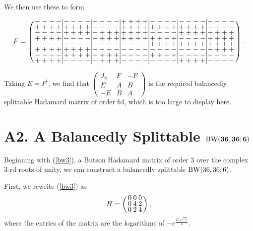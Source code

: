 \documentclass[../../main]{subfiles}
\begin{document}
We then use these to form
\begin{small}
\[
  F =
  \arraycolsep=1.25pt\def\arraystretch{0.625}
  \left(
    \begin{array}{cccc|cccc|cccc|cccc|cccc|cccc|cccc}
      -&-&-&-&-&-&-&-&-&-&-&-&+&+&+&+&-&-&-&-&-&-&-&-&-&-&-&-\\
      +&+&+&+&+&+&+&+&-&-&-&-&+&+&+&+&+&+&+&+&+&+&+&+&-&-&-&-\\
      -&-&-&-&+&+&+&+&+&+&+&+&+&+&+&+&-&-&-&-&+&+&+&+&+&+&+&+\\
      +&+&+&+&-&-&-&-&+&+&+&+&+&+&+&+&+&+&+&+&-&-&-&-&+&+&+&+\\
      -&-&-&-&-&-&-&-&-&-&-&-&-&-&-&-&+&+&+&+&+&+&+&+&+&+&+&+\\
      +&+&+&+&+&+&+&+&-&-&-&-&-&-&-&-&-&-&-&-&-&-&-&-&+&+&+&+\\
      -&-&-&-&+&+&+&+&+&+&+&+&-&-&-&-&+&+&+&+&-&-&-&-&-&-&-&-\\
      +&+&+&+&-&-&-&-&+&+&+&+&-&-&-&-&-&-&-&-&+&+&+&+&-&-&-&-\\
    \end{array}
  \right).
\]
\end{small}

Taking $E=F^t$, we find that
$
\left(
  \begin{smallmatrix}
    J_8 & F & -F \\
    E & A & B \\
    -E & B & A
  \end{smallmatrix}
\right)
$
is the required balancedly splittable Hadamard matrix of order 64, which is too
large to display here.

\fancyhf{}

\fancyhead[RO,LE]{\thepage}

\section*{A2. A Balancedly Splittable $\text{BW}\mathbf{(36,36;6)}$}

Beginning with (\ref{bw3}), a Butson Hadamard matrix of order 3 over the complex
3-rd roots of unity, we can construct a balancedly splittable $\text{BW}(36,36;6)$.

First, we rewrite (\ref{bw3}) as
\[
  H=
  \arraycolsep=1.25pt\def\arraystretch{0.625}
  \left(
    \begin{array}{ccc}
      0&0&0\\
      0&4&2\\
      0&2&4
    \end{array}
  \right),
\]
where the entries of the matrix are the logarithms of
$-e^\frac{2\pi\sqrt{-1}}{3}$.
\end{document}
